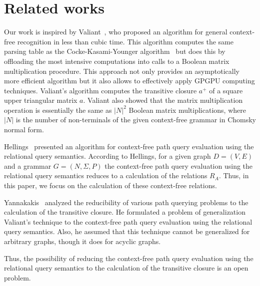 \section{Related works} \label{section_related}
Our work is inspired by Valiant~\cite{valiant}, who proposed an algorithm for general context-free recognition in less than cubic time. This algorithm computes the same parsing table as the Cocke-Kasami-Younger algorithm~\cite{kasami, younger} but does this by offloading the most intensive computations into calls to a Boolean matrix multiplication procedure. This approach not only provides an asymptotically more efficient algorithm but it also allows to effectively apply GPGPU computing techniques. Valiant's algorithm computes the transitive closure $a^+$ of a square upper triangular matrix $a$. Valiant also showed that the matrix multiplication operation is essentially the same as $|N|^2$ Boolean matrix multiplications, where $|N|$ is the number of non-terminals of the given context-free grammar in Chomsky normal form.

Hellings~\cite{hellingsRelational} presented an algorithm for context-free path query evaluation using the relational query semantics. According to Hellings, for a given graph $D = (V, E)$ and a grammar $G = (N, \Sigma, P)$ the context-free path query evaluation using the relational query semantics reduces to a calculation of the relations $R_A$. Thus, in this paper, we focus on the calculation of these context-free relations.

Yannakakis~\cite{transitive-closure} analyzed the reducibility of various path querying problems to the calculation of the transitive closure. He formulated a problem of generalization Valiant's technique to the context-free path query evaluation using the relational query semantics. Also, he assumed that this technique cannot be generalized for arbitrary graphs, though it does for acyclic graphs.

Thus, the possibility of reducing the context-free path query evaluation using the relational query semantics to the calculation of the transitive closure is an open problem.